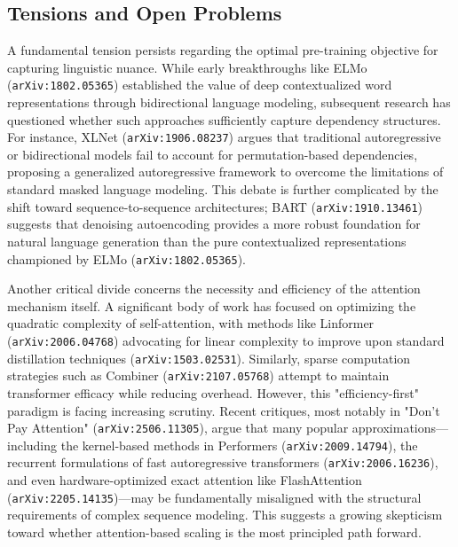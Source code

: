 \documentclass[11pt]{article}
\begin{document}
\subsection{Tensions and Open Problems}

A fundamental tension persists regarding the optimal pre-training objective for capturing linguistic nuance. While early breakthroughs like ELMo (\texttt{arXiv:1802.05365}) established the value of deep contextualized word representations through bidirectional language modeling, subsequent research has questioned whether such approaches sufficiently capture dependency structures. For instance, XLNet (\texttt{arXiv:1906.08237}) argues that traditional autoregressive or bidirectional models fail to account for permutation-based dependencies, proposing a generalized autoregressive framework to overcome the limitations of standard masked language modeling. This debate is further complicated by the shift toward sequence-to-sequence architectures; BART (\texttt{arXiv:1910.13461}) suggests that denoising autoencoding provides a more robust foundation for natural language generation than the pure contextualized representations championed by ELMo (\texttt{arXiv:1802.05365}).

Another critical divide concerns the necessity and efficiency of the attention mechanism itself. A significant body of work has focused on optimizing the quadratic complexity of self-attention, with methods like Linformer (\texttt{arXiv:2006.04768}) advocating for linear complexity to improve upon standard distillation techniques (\texttt{arXiv:1503.02531}). Similarly, sparse computation strategies such as Combiner (\texttt{arXiv:2107.05768}) attempt to maintain transformer efficacy while reducing overhead. However, this "efficiency-first" paradigm is facing increasing scrutiny. Recent critiques, most notably in "Don't Pay Attention" (\texttt{arXiv:2506.11305}), argue that many popular approximations—including the kernel-based methods in Performers (\texttt{arXiv:2009.14794}), the recurrent formulations of fast autoregressive transformers (\texttt{arXiv:2006.16236}), and even hardware-optimized exact attention like FlashAttention (\texttt{arXiv:2205.14135})—may be fundamentally misaligned with the structural requirements of complex sequence modeling. This suggests a growing skepticism toward whether attention-based scaling is the most principled path forward.
\end{document}
